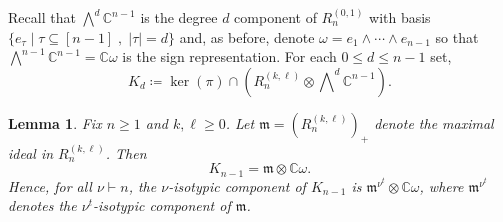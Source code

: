 \documentclass[11pt, reqno]{amsart}
\newtheorem{lemma}[theorem]{Lemma}
\theoremstyle{definition}
\theoremstyle{remark}
\numberwithin{equation}{section}
\newcommand{\0}{\emptyset}
\newcommand{\C}{\mathbb{C}}
\begin{document}
Recall that $\bigwedge^d \C^{n-1}$ is the degree $d$ component of 
$R_n^{(0,1)}$ with basis $\{e_\tau\mid \tau \subseteq [n-1]\;,\; |\tau|=d\}$ and, 
as before, denote $\omega= e_1\wedge \cdots \wedge e_{n-1}$ so that 
$\bigwedge^{n-1}\C^{n-1} = \C \omega$ is the sign representation. 
For each $0\leq d\leq n-1$ set,
\[
    K_d\coloneqq \ker(\pi) \cap \left(R_n^{(k,\ell)}\otimes \bigwedge\nolimits^d \C^{n-1}\right).
\]

\begin{lemma}\label{lem:K_{n-1}}
    Fix $n \geq 1$ and $k,\ell \geq 0$. Let $\mathfrak{m} =(R_n^{(k,\ell)})_+$ 
    denote the maximal ideal in $R_n^{(k,\ell)}$.
    Then
    \begin{equation*}
        K_{n-1} = \mathfrak{m} \otimes \C \omega.
    \end{equation*}
    Hence, for all $\nu \vdash n$, the $\nu$-isotypic component of $K_{n-1}$ is 
    $\mathfrak{m}^{\nu^t} \otimes \C \omega$, where $\mathfrak{m}^{\nu^t}$ 
    denotes the $\nu^t$-isotypic component of $\mathfrak{m}$.
\end{lemma}
\end{document}
